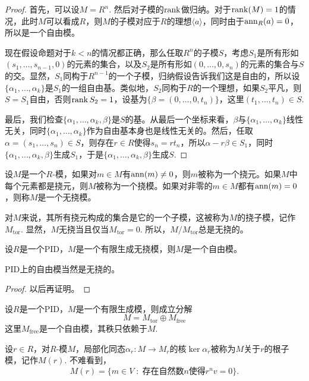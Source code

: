 \begin{proof}
	首先，可以设$M=R^n$. 然后对子模的$\operatorname{rank}$做归纳。对于$\operatorname{rank}(M)=1$的情况，此时$M$可以看成$R$，则$M$的子模对应于$R$的理想$\langle a\rangle$，同时由于$\operatorname{ann}_R (a)=0$，所以是一个自由模。

	现在假设命题对于$k<n$的情况都正确，那么任取$R^n$的子模$S$，考虑$S_1$是所有形如$(s_1,\dots,s_{n-1},0)$的元素的集合，以及$S_2$是所有形如$(0,\dots,0,s_n)$的元素的集合与$S$的交。显然，$S_1$同构于$R^{n-1}$的一个子模，归纳假设告诉我们这是自由的，所以设$\{\alpha_1,\dots,\alpha_k\}$是$S_1$的一组自由基。类似地，$S_2$同构于$R$的一个理想，如果$S_2$平凡，则$S=S_1$自由，否则$\operatorname{rank} S_2=1$，设基为$\{\beta=(0,\dots,0,t_n)\}$，这里$(t_1,\dots,t_n)\in S$. 

	最后，我们检查$\{\alpha_1,\dots,\alpha_k,\beta\}$是$S$的基。从最后一个坐标来看，$\beta$与$\{\alpha_1,\dots,\alpha_k\}$线性无关，同时$\{\alpha_1,\dots,\alpha_k\}$作为自由基本身也是线性无关的。然后，任取$\alpha=(s_1,\dots,s_n)\in S$，则存在$r\in R$使得$s_n=rt_n$，所以$\alpha-r\beta\in S_1$，同时$\{\alpha_1,\dots,\alpha_k,\beta\}$生成$S_1$，于是$\{\alpha_1,\dots,\alpha_k,\beta\}$生成$S$.
\end{proof}

\begin{para}[挠元、挠模]
	设$M$是一个$R$-模，如果对$m\in M$有$\operatorname{ann}(m)\neq 0$，则$m$被称为一个挠元。如果$M$中每个元素都是挠元，则$M$被称为一个挠模。如果对非零的$m\in M$都有$\operatorname{ann}(m)=0$，则称$M$是一个无挠模。
\end{para}

对$M$来说，其所有挠元构成的集合是它的一个子模，这被称为$M$的挠子模，记作$M_{\text{tor}}$. 显然，$M$无挠当且仅当$M_{\text{tor}}=0$. 所以，$M/M_{\text{tor}}$总是无挠的。

\begin{lem}
	设$R$是一个PID，$M$是一个有限生成无挠模，则$M$是一个自由模。
\end{lem}

PID上的自由模当然是无挠的。

\begin{proof}
	以后再证明。
\end{proof}

\begin{pro}
设$R$是一个PID，$M$是一个有限生成模，则成立分解
\[
	M=M_{\mathrm{tor}}\oplus M_{\mathrm{free}}
\]
这里$M_{\mathrm{free}}$是一个自由模，其秩只依赖于$M$.
\end{pro}

\begin{para}[根子模]
    设$r\in R$，对$R$-模$M$，局部化同态$\alpha_r:M\to M_r$的核$\ker \alpha_r$被称为$M$关于$r$的根子模，记作$M(r)$. 不难看到，
    \[
        M(r)=\{m\in V\;:\; \text{存在自然数$n$使得$r^nv=0$}\}.
    \]
\end{para}

